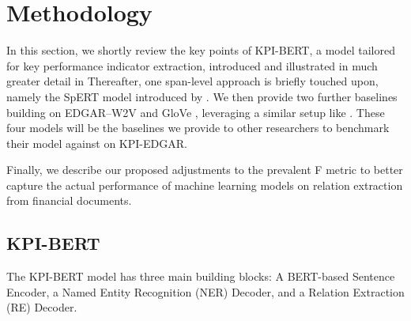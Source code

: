 \documentclass[conference, table]{IEEEtran}
\newcommand{\1} {\mathbbm{1}}
\begin{document}
\section{Methodology}
\label{section:methodology}

In this section, we shortly review the key points of KPI-BERT, a model tailored for key performance indicator extraction, introduced and illustrated in much greater detail in \cite{kpi-bert}
Thereafter, one span-level approach is briefly touched upon, namely the SpERT model introduced by \cite{eberts2019span}. 
We then provide two further baselines building on EDGAR--W2V \cite{loukas2021edgar} and GloVe \cite{pennington2014glove}, leveraging a similar setup like \cite{kpi-bert}.
These four models will be the baselines we provide to other researchers to benchmark their model against on KPI-EDGAR.

Finally, we describe our proposed adjustments to the prevalent F metric to better capture the actual performance of machine learning models on relation extraction from financial documents.

\subsection{KPI-BERT}
\label{subsection:kpibert}

The KPI-BERT \cite{kpi-bert} model has three main building blocks: A BERT-based Sentence Encoder, a Named Entity Recognition (NER) Decoder, and a Relation Extraction (RE) Decoder.
\end{document}
